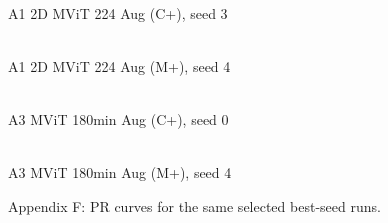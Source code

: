 \begin{figure}[p]
\centering
\begin{minipage}{0.48\textwidth}
\centering
{}
\\[-1mm]\scriptsize A1 2D MViT 224 Aug (C+), seed 3
\end{minipage}\hfill
\begin{minipage}{0.48\textwidth}
\centering
{}
\\[-1mm]\scriptsize A1 2D MViT 224 Aug (M+), seed 4
\end{minipage}
\vspace{2mm}
\begin{minipage}{0.48\textwidth}
\centering
{}
\\[-1mm]\scriptsize A3 MViT 180min Aug (C+), seed 0
\end{minipage}\hfill
\begin{minipage}{0.48\textwidth}
\centering
{}
\\[-1mm]\scriptsize A3 MViT 180min Aug (M+), seed 4
\end{minipage}
\caption{Appendix F: PR curves for the same selected best-seed runs.}
\label{fig:appF_pr_grid}
\end{figure}
